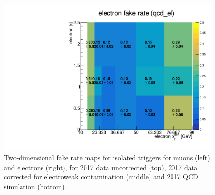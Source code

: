 \begin{figure}[!hbtp]
    \includegraphics[width=.42\textwidth]{figs/ssan/fakerate/derivation/y2017/y2017_el_fr_cone_qcd_el_LooseEMVA_IsoTrigs.pdf}
        \caption{  Two-dimensional fake rate maps for isolated triggers for muons (left) and electrons (right),
        for 2017 data uncorrected (top),
        2017 data corrected for electroweak contamination (middle) and 2017 QCD simulation (bottom).
        }
    \label{fig:QCDFRMuEleRaw2017iso}
    \end{figure}

